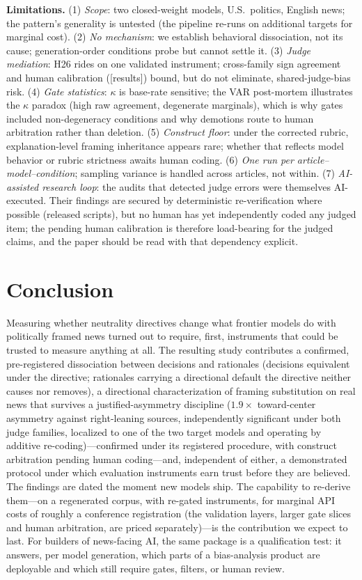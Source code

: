\documentclass{article}
\newcommand{\pending}[1]{\textcolor{orange!80!black}{[#1]}}
\newcommand{\kap}{\kappa}
\begin{document}
\textbf{Limitations.} (1) \emph{Scope}: two closed-weight models, U.S.\
politics, English news; the pattern's generality is untested (the pipeline
re-runs on additional targets for marginal cost). (2) \emph{No mechanism}:
we establish behavioral dissociation, not its cause; generation-order conditions
probe but cannot settle it. (3) \emph{Judge mediation}: H26 rides on one
validated instrument; cross-family sign agreement and human calibration
(\pending{results}) bound, but do not eliminate, shared-judge-bias risk.
(4) \emph{Gate statistics}: $\kap$ is base-rate sensitive; the VAR
post-mortem illustrates the $\kap$ paradox (high raw agreement, degenerate
marginals), which is why gates included non-degeneracy conditions and why
demotions route to human arbitration rather than deletion. (5)
\emph{Construct floor}: under the corrected rubric, explanation-level
framing inheritance appears rare; whether that reflects model behavior or
rubric strictness awaits human coding. (6) \emph{One run per article--model--condition};
sampling variance is handled across articles, not within. (7)
\emph{AI-assisted research loop}: the audits that detected judge errors
were themselves AI-executed. Their findings are secured by deterministic
re-verification where possible (released scripts), but no human has yet
independently coded any judged item; the pending human calibration is
therefore load-bearing for the judged claims, and the paper should be
read with that dependency explicit.

\section{Conclusion}

Measuring whether neutrality directives change what frontier models do
with politically framed news turned out to require, first, instruments
that could be trusted to measure anything at all. The
resulting study contributes a confirmed, pre-registered dissociation
between decisions and rationales (decisions equivalent under the
directive; rationales carrying a directional default the directive
neither causes nor removes), a directional
characterization of framing substitution on real news that survives a
justified-asymmetry discipline ($1.9\times$ toward-center asymmetry
against right-leaning sources, independently significant under both
judge families, localized to one of the two target models and operating
by additive re-coding)---confirmed under its registered procedure,
with construct arbitration pending human coding---and, independent of
either, a demonstrated
protocol under which evaluation instruments earn trust before they are
believed. The findings are dated the moment new
models ship. The capability to re-derive them---on a regenerated corpus,
with re-gated instruments, for marginal API costs of roughly a
conference registration (the validation layers, larger gate slices and
human arbitration, are priced separately)---is the contribution we
expect to last. For builders of news-facing AI, the same package is a
qualification test: it answers, per model generation, which parts of
a bias-analysis product are deployable and which still require gates,
filters, or human review.
\end{document}
